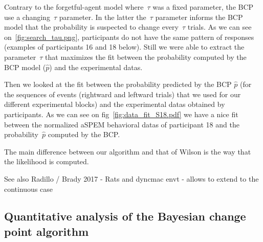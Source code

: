 \documentclass[profile,final,english, draft]{article}%
\begin{document}
Contrary to the forgetful-agent model where~$\tau$ was a fixed parameter, the BCP use a changing~$\tau$ parameter. In the latter the~$\tau$ parameter informs the BCP model that the probability is suspected to change every~$\tau$ trials. As we can see on~\ref{fig:search_tau.png}, participants do not have the same pattern of responses (examples of participants 16 and 18 below). Still we were able to extract the parameter~$\tau$ that maximizes the fit between the probability computed by the BCP model ($\hat{p}$) and the experimental datas.


\hfill \break
 Then we looked at the fit between the probability predicted by the BCP $\hat{p}$ (for the sequences of events (rightward and leftward trials) that we used for our different experimental blocks) and the experimental datas obtained by participants. As we can see on fig~\ref{fig:data_fit_S18.pdf} we have a nice fit between the normalized aSPEM behavioral datas of participant 18 and the probability~$\hat{p}$ computed by the BCP.



The main difference between our algorithm and that of Wilson is the way that the likelihood is computed.

See also Radillo / Brady 2017 - Rats and dyncmac envt - allows to extend to the continuous case

\subsection{Quantitative analysis of the Bayesian change point algorithm}
\end{document}
